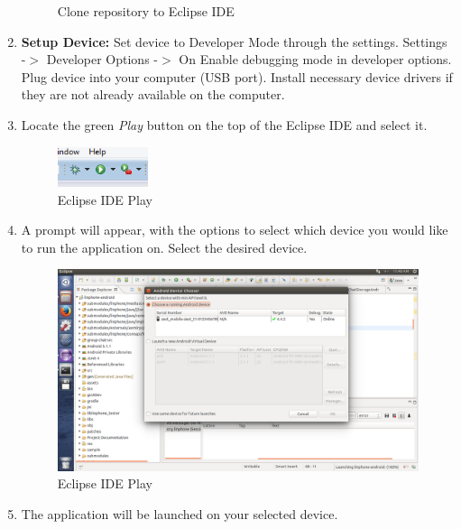 \documentclass[11pt]{article}
\begin{document}
\begin{enumerate}
\begin{figure}[H]
\caption{Clone repository to Eclipse IDE}
\label{eclipse_ide_repo}
\end{figure}
\item \textbf{Setup Device: } Set device to Developer Mode through the settings. 
\subitem Settings -$>$ Developer Options -$>$ On
\subitem Enable debugging mode in developer options.
\subitem Plug device into your computer (USB port).
\subitem Install necessary device drivers if they are not already available on the computer.
\item Locate the green \textit{Play} button on the top of the Eclipse IDE and select it.
\begin{figure}[H]
\centering
\includegraphics[width=100px]{./images/eclipsePlay.png}
\caption{Eclipse IDE Play}
\label{eclipse_play}
\end{figure}
\item A prompt will appear, with the options to select which device you would like to run the application on. Select the desired device.
\begin{figure}[H]
\includegraphics[width=5in]{./images/ChooseDeviceScreenShot.png}
\caption{Eclipse IDE Play}
\label{choose_dev}
\end{figure}
\item The application will be launched on your selected device.
\end{enumerate}
\end{document}
